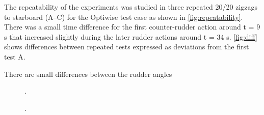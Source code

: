 \noindent The repeatability of the experiments was studied in three repeated 20/20 zigzags to starboard (A--C) for the Optiwise test case as shown in \autoref{fig:repeatability}. There was a small time difference for the first counter-rudder action around t = 9 s that increased slightly during the later rudder actions around t = 34 s.
\autoref{fig:diff} shows differences between repeated tests expressed as deviations from the first test A. 

There are small differences between the rudder angles   

\begin{figure}[h!]
    \centering   
    
    \caption{.}
    \label{fig:repeatability}
\end{figure}
\begin{figure}[h!]
    \centering   
    
    \caption{.}
    \label{fig:diff}
\end{figure}
%    
%
%    
